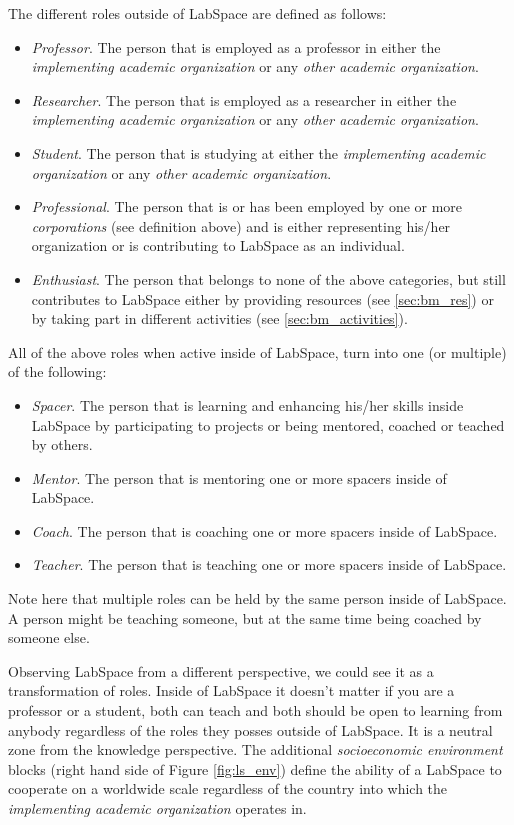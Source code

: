 \documentclass[a4paper, 11pt]{article}
\begin{document}
The different roles outside of LabSpace are defined as follows:

\begin{itemize}[noitemsep]
    \item \textit{Professor}. The person that is employed as a professor in either the \textit{implementing academic organization} or any \textit{other academic organization}.
    \item \textit{Researcher}. The person that is employed as a researcher in either the \textit{implementing academic organization} or any \textit{other academic organization}.
    \item \textit{Student}. The person that is studying at either the \textit{implementing academic organization} or any \textit{other academic organization}.
    \item \textit{Professional}. The person that is or has been employed by one or more \textit{corporations} (see definition above) and is either representing his/her organization or is contributing to LabSpace as an individual.
    \item \textit{Enthusiast}. The person that belongs to none of the above categories, but still contributes to LabSpace either by providing resources (see \ref{sec:bm_res}) or by taking part in different activities  (see \ref{sec:bm_activities}).
\end{itemize}

All of the above roles when active inside of LabSpace, turn into one (or multiple) of the following:

\begin{itemize}[noitemsep]
    \item \textit{Spacer}. The person that is learning and enhancing his/her skills inside LabSpace by participating to projects or being mentored, coached or teached by others.
    \item \textit{Mentor}. The person that is mentoring one or more spacers inside of LabSpace.
    \item \textit{Coach}. The person that is coaching one or more spacers inside of LabSpace.
    \item \textit{Teacher}. The person that is teaching one or more spacers inside of LabSpace.
\end{itemize}

Note here that multiple roles can be held by the same person inside of LabSpace. A person might be teaching someone, but at the same time being coached by someone else.

Observing LabSpace from a different perspective, we could see it as a transformation of roles. Inside of LabSpace it doesn't matter if you are a professor or a student, both can teach and both should be open to learning from anybody regardless of the roles they posses outside of LabSpace. It is a neutral zone from the knowledge perspective. The additional \textit{socioeconomic environment} blocks (right hand side of Figure \ref{fig:ls_env}) define the ability of a LabSpace to cooperate on a worldwide scale regardless of the country into which the \textit{implementing academic organization} operates in.
\end{document}
